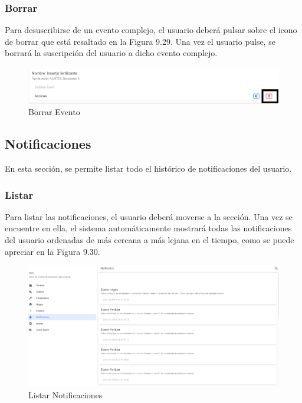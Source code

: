\subsubsection{Borrar}
Para desuscribirse de un evento complejo, el usuario deberá pulsar sobre el icono de borrar que está resaltado en la Figura 9.29. Una vez el usuario pulse, se borrará la suscripción del usuario a dicho evento complejo.
\begin{figure}[H]
    \centering
    \includegraphics[width=0.7\linewidth]{images/user-manual/events/delete.png}
    \caption{Borrar Evento}
\end{figure}

\subsection{Notificaciones}
En esta sección, se permite listar todo el histórico de notificaciones del usuario.

\subsubsection{Listar}
Para listar las notificaciones, el usuario deberá moverse a la sección. Una vez se encuentre en ella, el sistema automáticamente mostrará todas las notificaciones del usuario ordenadas de más cercana a más lejana en el tiempo, como se puede apreciar en la Figura 9.30.
\begin{figure}[H]
    \centering
    \includegraphics[width=0.7\linewidth]{images/user-manual/notifications/list.png}
    \caption{Listar Notificaciones}
\end{figure}

